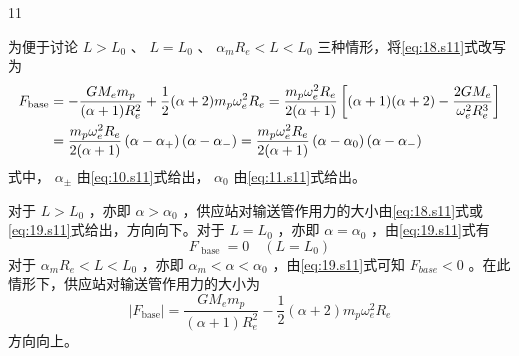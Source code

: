 \begin{solution}{11}
\begin{subsolution}
为便于讨论 $L > L_{0}$ 、 $L = L_{0}$ 、 $\alpha_{m} R_{e} < L < L_{0}$ 三种情形，将\eqref{eq:18.s11}式改写为
\begin{align}
F _ {\text {base}} &= - \frac {G M _ {e} m _ {p}}{(\alpha + 1) R _ {e} ^ {2}} + \frac {1}{2} (\alpha + 2) m _ {p} \omega_ {e} ^ {2} R _ {e} = \frac {m _ {p} \omega_ {e} ^ {2} R _ {e}}{2 (\alpha + 1)} \left[ (\alpha + 1) (\alpha + 2) - \frac {2 G M _ {e}}{\omega_ {e} ^ {2} R _ {e} ^ {3}} \right] \notag \\
&= \frac {m _ {p} \omega_ {e} ^ {2} R _ {e}}{2 (\alpha + 1)} \left(\alpha - \alpha_ {+}\right) \left(\alpha - \alpha_ {-}\right) = \frac {m _ {p} \omega_ {e} ^ {2} R _ {e}}{2 (\alpha + 1)} \left(\alpha - \alpha_ {0}\right) \left(\alpha - \alpha_ {-}\right)
\label{eq:19.s11}
\end{align}
式中， $\alpha_{\pm}$ 由\eqref{eq:10.s11}式给出， $\alpha_{0}$ 由\eqref{eq:11.s11}式给出。

对于 $L > L_{0}$ ，亦即 $\alpha > \alpha_{0}$ ，供应站对输送管作用力的大小由\eqref{eq:18.s11}式或\eqref{eq:19.s11}式给出，方向向下。对于 $L = L_{0}$ ，亦即 $\alpha = \alpha_{0}$ ，由\eqref{eq:19.s11}式有
\begin{equation}
F _ {\text { base }} = 0 \quad (L = L _ {0})
\label{eq:20.s11}
\end{equation}
对于 $\alpha_{m}R_{e}<L<L_{0}$ ，亦即 $\alpha_{m}<\alpha<\alpha_{0}$ ，由\eqref{eq:19.s11}式可知 $F_{base}<0$ 。在此情形下，供应站对输送管作用力的大小为
\begin{equation}
\left| F _ {\text {base}} \right| = \frac {G M _ {e} m _ {p}}{(\alpha + 1) R _ {e} ^ {2}} - \frac {1}{2} (\alpha + 2) m _ {p} \omega_ {e} ^ {2} R _ {e}
\label{eq:21.s11}
\end{equation}
方向向上。
\end{subsolution}
\end{solution}